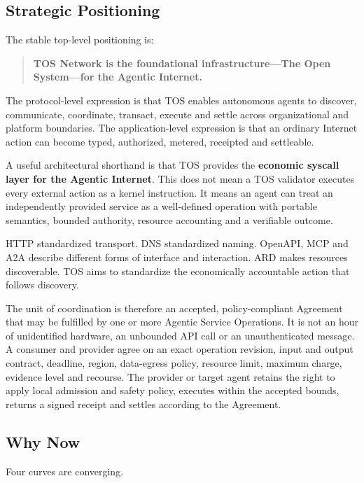 \documentclass[11pt,oneside]{article}
\begin{document}
\subsection{Strategic Positioning}

The stable top-level positioning is:

\begin{quote}
\textbf{TOS Network is the foundational infrastructure---The Open System---for the Agentic
Internet.}
\end{quote}

The protocol-level expression is that TOS enables autonomous agents to discover,
communicate, coordinate, transact, execute and settle across organizational and platform
boundaries. The application-level expression is that an ordinary Internet action can become
typed, authorized, metered, receipted and settleable.

A useful architectural shorthand is that TOS provides the \textbf{economic syscall layer for
the Agentic Internet}. This does not mean a TOS validator executes every external action as a
kernel instruction. It means an agent can treat an independently provided service as a
well-defined operation with portable semantics, bounded authority, resource accounting and a
verifiable outcome.

HTTP standardized transport. DNS standardized naming. OpenAPI, MCP and A2A describe different
forms of interface and interaction. ARD makes resources discoverable. TOS aims to standardize
the economically accountable action that follows discovery.

The unit of coordination is therefore an accepted, policy-compliant Agreement that may be
fulfilled by one or more Agentic Service Operations. It is not an hour of unidentified
hardware, an unbounded API call or an unauthenticated message. A consumer and provider agree
on an exact operation revision, input and output contract, deadline, region, data-egress
policy, resource limit, maximum charge, evidence level and recourse. The provider or target
agent retains the right to apply local admission and safety policy, executes within the
accepted bounds, returns a signed receipt and settles according to the Agreement.

\subsection{Why Now}

Four curves are converging.
\end{document}
